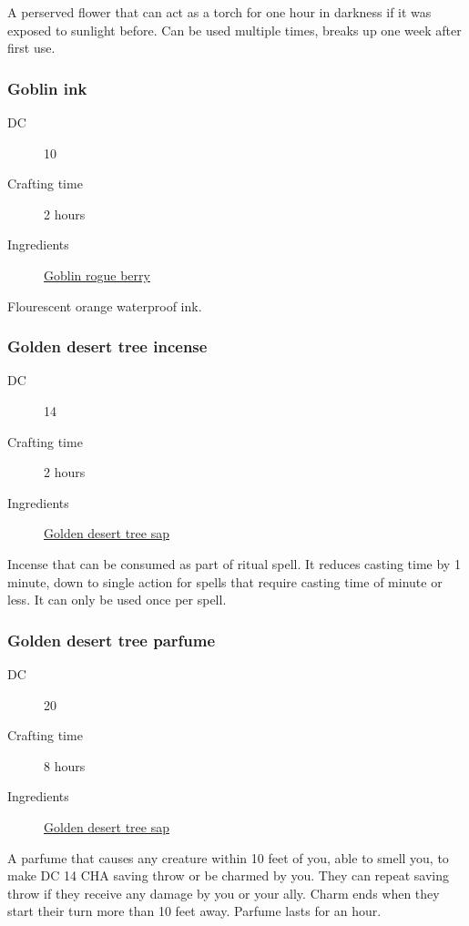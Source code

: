 A perserved flower that can act as a torch for one hour in darkness if it was exposed to sunlight before. 
Can be used multiple times, breaks up one week after first use.

\subsubsection{Goblin ink}
\label{Goblin ink}

\begin{description}
\item [DC] 10
\item [Crafting time] 2 hours
\item [Ingredients] \hyperref[Goblin Rogue]{Goblin rogue berry}
\end{description}

Flourescent orange waterproof ink.

\subsubsection{Golden desert tree incense}
\label{Golden desert tree incense}

\begin{description}
\item [DC] 14
\item [Crafting time] 2 hours
\item [Ingredients] \hyperref[Golden Desert Tree]{Golden desert tree sap}
\end{description}

Incense that can be consumed as part of ritual spell. It reduces casting time by 1 minute, down to single action for spells that require casting time of minute or less. It can only be used once per spell.

\subsubsection{Golden desert tree parfume}
\label{Golden desert tree parfume}

\begin{description}
\item [DC] 20
\item [Crafting time] 8 hours
\item [Ingredients] \hyperref[Golden Desert Tree]{Golden desert tree sap}
\end{description}

A parfume that causes any creature within 10 feet of you, able to smell you, to make DC 14 CHA
 saving throw or be charmed by you. They can repeat saving throw if they receive any damage by you 
 or your ally. Charm ends when they start their turn more than 10 feet away. Parfume lasts for an hour.

